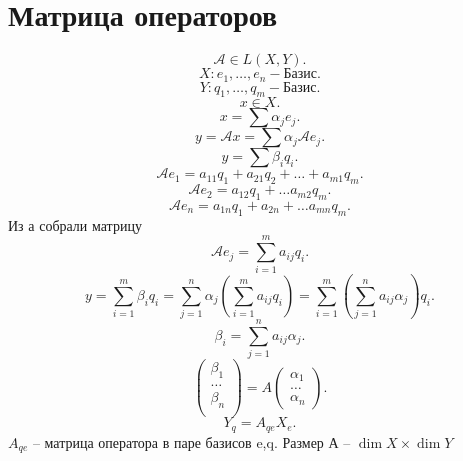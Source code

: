 \documentclass{scrartcl}
\begin{document}
\section{Матрица операторов}
\[
    \mathcal{A} \in L(X,Y)
.\] 
\[
    X : e_1,\dots,e_n - \text{Базис}
.\] 
\[
    Y: q_1,\dots,q_{m} - \text{Базис}
.\] 
\[
x \in X
.\] 
\[
x = \sum \alpha_{j} e_{j}
.\] 
\[
    y = \mathcal{A} x = \sum \alpha_{j} \mathcal{A} e_{j}
.\] 
\[
 y = \sum  \beta_{i} q_{i}
.\]
\[
    \mathcal{A} e_1 = a_{11} q_1 + a_{21} q_2 + \dots + a_{m1} q_{m}
.\] 
\[
    \mathcal{A} e_2 = a_{12} q_1 + \dots a_{m 2} q_{m}
.\] 
\[
    \mathcal{A} e_{n} = a_{1 n} q_1 + a_{2 n} + \dots a_{mn} q_{m}
.\] 
Из а собрали матрицу
\[
    \mathcal{A} e_{j} = \sum_{i = 1}^{m} a_{ij} q_{i}
.\] 
\[
y = \sum_{i = 1}^{m} \beta_{i}q_{i} = \sum_{j = 1}^{n} \alpha_{j} ( \sum_{i = 1}^{m} a_{ij} q_{i} ) =
\sum_{i = 1}^{m} ( \sum_{j = 1}^{n} a_{ij} \alpha_{j} ) q_{i}
.\] 
\[
    \beta_{i} = \sum_{j = 1} ^{n} a_{ij} \alpha_{j}
.\] 
\[
\begin{pmatrix} 
\beta_1\\
\dots\\
\beta_{n}\\
\end{pmatrix}  =
A
\begin{pmatrix} 
\alpha_1\\
\dots\\
\alpha_{n}
\end{pmatrix} 
.\] 
\[
Y_{q} = A_{qe}X_{e}
.\] 
$A_{qe}$ -- матрица оператора в паре базисов e,q.
Размер А -- $\dim{X} \times \dim{Y}$
\end{document}

